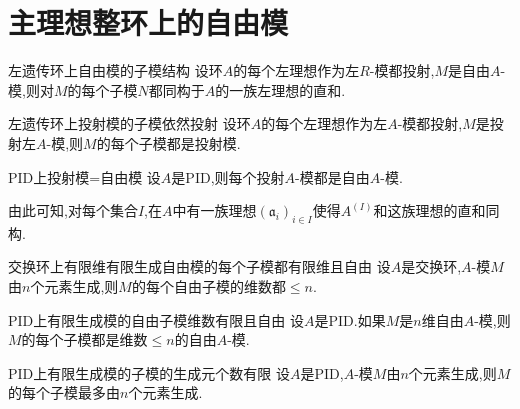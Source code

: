 \chapter{主理想整环上的自由模}

\begin{theorem}{左遗传环上自由模的子模结构}{}
	设环$A$的每个左理想作为左$R$-模都投射,$M$是自由$A$-模,则对$M$的每个子模$N$都同构于$A$的一族左理想的直和.
\end{theorem}

\begin{corollary}{左遗传环上投射模的子模依然投射}{}
	设环$A$的每个左理想作为左$A$-模都投射,$M$是投射左$A$-模,则$M$的每个子模都是投射模.
\end{corollary}

\begin{corollary}{PID上投射模=自由模}{}
	设$A$是PID,则每个投射$A$-模都是自由$A$-模.
\end{corollary}

\begin{remark}{}{}
	由此可知,对每个集合$I$,在$A$中有一族理想$\left(\mathfrak{a}_{i}\right)_{i\in I}$使得$A^{\left(I\right)}$和这族理想的直和同构.
\end{remark}

\begin{lemma}{交换环上有限维有限生成自由模的每个子模都有限维且自由}{}
	设$A$是交换环,$A$-模$M$由$n$个元素生成,则$M$的每个自由子模的维数都$\leq n$.
\end{lemma}

\begin{proposition}{PID上有限生成模的自由子模维数有限且自由}{}
	设$A$是PID.如果$M$是$n$维自由$A$-模,则$M$的每个子模都是维数$\leq n$的自由$A$-模.
\end{proposition}

\begin{corollary}{PID上有限生成模的子模的生成元个数有限}{}
	设$A$是PID,$A$-模$M$由$n$个元素生成,则$M$的每个子模最多由$n$个元素生成.
\end{corollary}